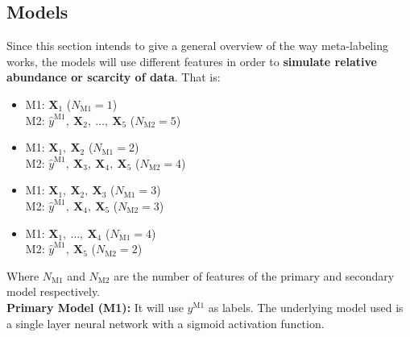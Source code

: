 \documentclass[a4paper]{report}
\begin{document}
\subsection{Models}
Since this section intends to give a general overview of the way 
meta-labeling works, the models will use different features in order to 
\textbf{simulate relative abundance or scarcity of data}. That is:

\begin{itemize}
	\item M1: $\textbf{X}_1$ \hfill 
	($N_\text{M1} = 1$) 	\hspace{0.5\textwidth} \\
	M2: $\widehat{y}^{\text{M1}},\ \textbf{X}_2,\ \ldots,\ \textbf{X}_5$ 
	\hfill ($N_\text{M2} = 5$) \hspace{0.5\textwidth}
	
	\item M1: $\textbf{X}_1,\ \textbf{X}_2$ \hfill
	($N_\text{M1} = 2$) \hspace{0.5\textwidth} \\
	M2: $\widehat{y}^{\text{M1}},\ \textbf{X}_3,\ \textbf{X}_4,\ 
	\textbf{X}_5$ 
	\hfill ($N_\text{M2} = 4$) \hspace{0.5\textwidth}
	
	\item M1: $\textbf{X}_1,\ \textbf{X}_2,\ \textbf{X}_3$ \hfill 
	($N_\text{M1} = 3$) \hspace{0.5\textwidth} \\
	M2: $\widehat{y}^{\text{M1}},\ \textbf{X}_4,\ \textbf{X}_5$ 
	\hfill ($N_\text{M2} = 3$) \hspace{0.5\textwidth}
	
	\item M1: $\textbf{X}_1,\ \ldots,\ \textbf{X}_4$ \hfill
	($N_\text{M1} = 4$) \hspace{0.5\textwidth} \\
	M2: $\widehat{y}^{\text{M1}},\ \textbf{X}_5$ 
	\hfill ($N_\text{M2} = 2$) \hspace{0.5\textwidth} \\
\end{itemize}

Where $N_{\text{M1}}$ and $N_{\text{M2}}$ are the number of features of the 
primary and secondary model respectively.\\

\textbf{Primary Model (M1):} It will use $y^{\text{M1}}$ as labels. 
The underlying model used is a single layer neural network with a 
sigmoid activation function.\\
\end{document}
